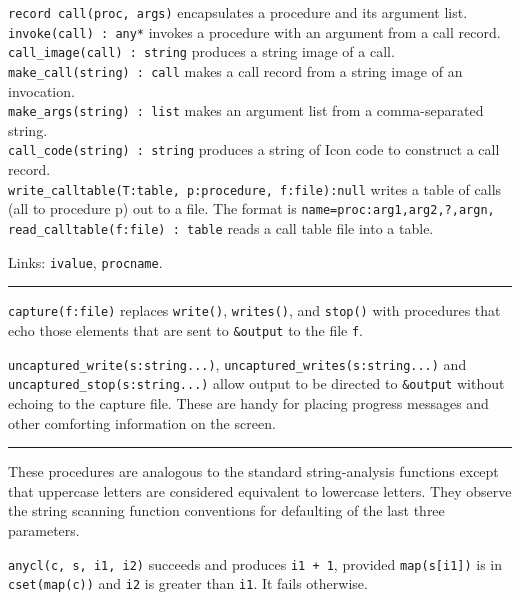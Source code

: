 \texttt{record call(proc, args)} encapsulates a procedure
and its argument list.\\
\texttt{invoke(call) : any*} invokes a procedure with an argument from a
call record.\\
\texttt{call\_image(call) : string} produces a string image of a
call.\\
\texttt{make\_call(string) : call} makes a call record from a string
image of an invocation.\\
\texttt{make\_args(string) : list} makes an argument list from a
comma-separated string.\\
\texttt{call\_code(string) : string} produces a string of Icon code to
construct a call record.\\
\texttt{write\_calltable(T:table, p:procedure, f:file):null} writes a
table of calls (all to procedure p) out to a file. The format is
\texttt{name=proc:arg1,arg2,?,argn,}\\
\texttt{read\_calltable(f:file) : table} reads a call table file into a
table.

Links: \texttt{ivalue}, \texttt{procname}. 

\vspace{0.25cm}\hrule{}

\texttt{capture(f:file)} replaces \texttt{write()}, \texttt{writes()},
and \texttt{stop()} with procedures that echo those elements that are
sent to \texttt{\&output} to the file \texttt{f}.

\texttt{uncaptured\_write(s:string...)},
\texttt{uncaptured\_writes(s:string...)} and \linebreak
\texttt{uncaptured\_stop(s:string...)} allow output to be directed to
\texttt{\&output} without echoing to the capture file. These are handy
for placing progress messages and other comforting information on the
screen.

\vspace{0.25cm}\hrule{}

These procedures are analogous to the standard string-analysis functions
except that uppercase letters are considered equivalent to lowercase
letters. They observe the string scanning function conventions for
defaulting of the last three parameters.

\texttt{anycl(c, s, i1, i2)} succeeds and produces \texttt{i1 + 1},
provided \texttt{map(s[i1])} is in \texttt{cset(map(c))} and
\texttt{i2} is greater than \texttt{i1}. It fails otherwise.

